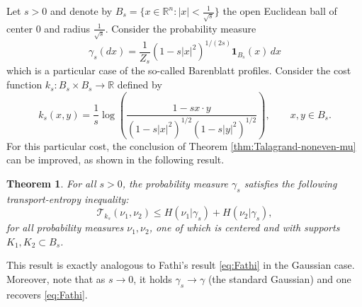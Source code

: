 \documentclass[10pt]{amsart}
\newtheorem{thm}{Theorem}[section]
\theoremstyle{definition}
\theoremstyle{remark}
\newcommand{\R}{\mathbb{R}}
\begin{document}
Let $s >0$ and denote by $B_{s} = \{ x \in \R^n : |x| < \frac{1}{\sqrt{s}}\}$ the open Euclidean ball of center $0$ and radius $\frac{1}{\sqrt{s}}$.
Consider the probability measure 
\[
\gamma_{s}(dx) = \frac{1}{Z_s} \left(1 - s |x|^2\right)^{1/(2 s)} \mathbf{1}_{B_s}(x) \,dx
\]
which is a particular case of the so-called Barenblatt profiles.
Consider the cost function $k_s : B_{s} \times B_{s} \to \R$ defined by
\[
k_s(x,y) =  \frac{1}{s}\log \left( \frac{1- s x\cdot y}{(1- s |x|^2)^{1/2}(1- s|y|^2)^{1/2}}\right),\qquad x,y \in B_{s}.
\]
For this particular cost, the conclusion of Theorem \ref{thm:Talagrand-noneven-mu} can be improved, as shown in the following result.
\begin{thm}\label{thm:Barenblatt}For all $s>0$, the probability measure $\gamma_s$ satisfies the following transport-entropy inequality: 
\[
\mathcal{T}_{k_s} (\nu_1,\nu_2) \leq H(\nu_1 |  \gamma_s) + H(\nu_2 |  \gamma_s),
\]
for all probability measures $\nu_1,\nu_2$, one of which is centered and with supports $K_1,K_2 \subset B_{s}$.
\end{thm}
This result is exactly analogous to Fathi's result  \eqref{eq:Fathi} in the Gaussian case. Moreover, note that as $s \to 0$, it holds $\gamma_s \to \gamma$ (the standard Gaussian) and one recovers \eqref{eq:Fathi}.
\end{document}
